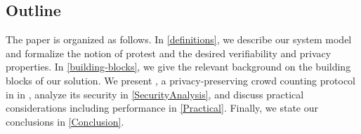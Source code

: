 \subsection{Outline}

The paper is organized as follows.
In \cref{definitions}, we describe our system model and formalize the notion of 
protest and the desired verifiability and privacy properties.
In \cref{building-blocks}, we give the relevant background on the building 
blocks of our solution.
%
%
We present \CROCUS, a privacy-preserving crowd counting 
protocol in in , analyze its security in
\cref{SecurityAnalysis}, and discuss practical considerations including performance in \cref{Practical}.
Finally, we state
our conclusions in \cref{Conclusion}.
